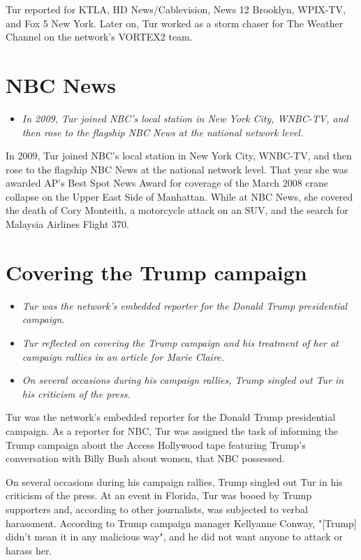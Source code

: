 Tur reported for KTLA, HD News/Cablevision, News 12 Brooklyn, WPIX-TV,
and Fox 5 New York. Later on, Tur worked as a storm chaser for The
Weather Channel on the network's VORTEX2 team.

\section{NBC News}\label{nbc-news}

\begin{itemize}
\item
  \emph{In 2009, Tur joined NBC's local station in New York City,
  WNBC-TV, and then rose to the flagship NBC News at the national
  network level.}
\end{itemize}

In 2009, Tur joined NBC's local station in New York City, WNBC-TV, and
then rose to the flagship NBC News at the national network level. That
year she was awarded AP's Best Spot News Award for coverage of the March
2008 crane collapse on the Upper East Side of Manhattan. While at NBC
News, she covered the death of Cory Monteith, a motorcycle attack on an
SUV, and the search for Malaysia Airlines Flight 370.

\section{Covering the Trump campaign}\label{covering-the-trump-campaign}

\begin{itemize}
\item
  \emph{Tur was the network's embedded reporter for the Donald Trump
  presidential campaign.}
\item
  \emph{Tur reflected on covering the Trump campaign and his treatment
  of her at campaign rallies in an article for Marie Claire.}
\item
  \emph{On several occasions during his campaign rallies, Trump singled
  out Tur in his criticism of the press.}
\end{itemize}

Tur was the network's embedded reporter for the Donald Trump
presidential campaign. As a reporter for NBC, Tur was assigned the task
of informing the Trump campaign about the Access Hollywood tape
featuring Trump's conversation with Billy Bush about women, that NBC
possessed.

On several occasions during his campaign rallies, Trump singled out Tur
in his criticism of the press. At an event in Florida, Tur was booed by
Trump supporters and, according to other journalists, was subjected to
verbal harassment. According to Trump campaign manager Kellyanne Conway,
"{[}Trump{]} didn't mean it in any malicious way", and he did not want
anyone to attack or harass her.

